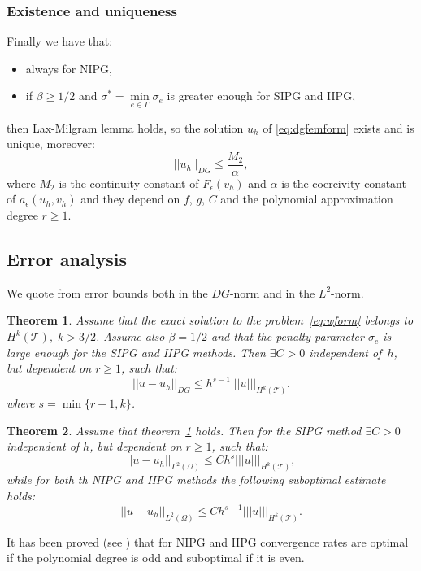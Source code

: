 \documentclass[12pt, a4paper]{article}
\theoremstyle{definition}
\theoremstyle{plain}
\theoremstyle{plain}
\newtheorem{teor}{Theorem}
\theoremstyle{definition}
\begin{document}
\subsubsection{Existence and uniqueness}
Finally we have that:
\begin{itemize}
	\item always for NIPG,
	\item if $\beta \geq 1/2$ and $\sigma^* = \min\limits_{e \in \Gamma} 
	\sigma_e$ is greater enough for SIPG and IIPG,
\end{itemize}
then Lax-Milgram lemma holds, so the solution $u_h$ of \eqref{eq:dgfemform} 
exists and is unique, moreover:\\
\begin{equation*}
	|\!|u_h|\!|_{DG} \leq \frac{M_2}{\alpha},
\end{equation*}
where $M_2$ is the continuity constant of $F_\epsilon(v_h)$ and $\alpha$ is the 
coercivity constant of $a_\epsilon(u_h,v_h)$ and they depend on $f$, $g$, 
$\bar{C}$ and the polynomial approximation degree $r \geq 1$.
\subsection{Error analysis}
We quote from \cite{riviere} error bounds both in the $DG$-norm and in the $L^2$-norm.
\begin{teor} \label{teo:errdg}
	Assume that the exact solution to the problem~\eqref{eq:wform} belongs to 
	$H^k(\mathcal{T}), \; k>3/2$. Assume also $\beta = 1/2$ and that the 
	penalty parameter $\sigma_e$ is large enough for the SIPG and IIPG methods. 
	Then $\exists C>0$ independent of~$h$, but dependent on $r \geq 1$, such 
	that:
	\begin{equation*}
		|\!| u -u_h |\!|_{DG} \leq h^{s-1} |\!|\!|u|\!|\!|_{H^k(\mathcal{T})}.
	\end{equation*}
	where $s = \min \{r+1, k\}$.
\end{teor}
\begin{teor}
	Assume that theorem~\ref{teo:errdg} holds. Then for the SIPG method 
	$\exists C>0$ independent of $h$, but dependent on $r \geq 1$, such that:
	\begin{equation*}
		|\!| u-u_h |\!|_{L^2(\Omega)} \leq C h^{s} |\!|\!|u|\!|\!|_{H^k(\mathcal{T})},
	\end{equation*}
	while for both th NIPG and IIPG methods the following suboptimal estimate holds:
	\begin{equation*}
				|\!| u-u_h |\!|_{L^2(\Omega)} \leq C h^{s-1} 
				|\!|\!|u|\!|\!|_{H^k(\mathcal{T})}.
	\end{equation*}
\end{teor}
It has been proved (see \cite{ayuso}) that for NIPG and IIPG convergence rates 
are 
optimal if the 
polynomial degree is odd and suboptimal if it is even.\\
\end{document}
